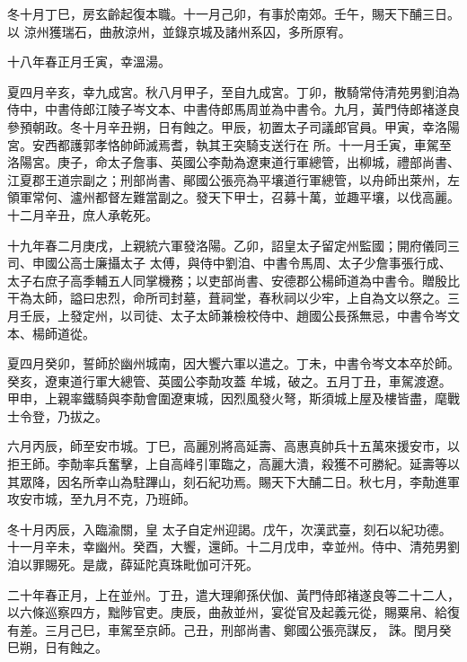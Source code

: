 \begin{pinyinscope}
 冬十月丁巳，房玄齡起復本職。十一月己卯，有事於南郊。壬午，賜天下酺三日。以
 涼州獲瑞石，曲赦涼州，並錄京城及諸州系囚，多所原宥。



 十八年春正月壬寅，幸溫湯。



 夏四月辛亥，幸九成宮。秋八月甲子，至自九成宮。丁卯，散騎常侍清苑男劉洎為侍中，中書侍郎江陵子岑文本、中書侍郎馬周並為中書令。九月，黃門侍郎褚遂良參預朝政。冬十月辛丑朔，日有蝕之。甲辰，初置太子司議郎官員。甲寅，幸洛陽宮。安西都護郭孝恪帥師滅焉耆，執其王突騎支送行在
 所。十一月壬寅，車駕至洛陽宮。庚子，命太子詹事、英國公李勣為遼東道行軍總管，出柳城，禮部尚書、江夏郡王道宗副之；刑部尚書、鄖國公張亮為平壤道行軍總管，以舟師出萊州，左領軍常何、瀘州都督左難當副之。發天下甲士，召募十萬，並趣平壤，以伐高麗。十二月辛丑，庶人承乾死。



 十九年春二月庚戌，上親統六軍發洛陽。乙卯，詔皇太子留定州監國；開府儀同三司、申國公高士廉攝太子
 太傅，與侍中劉洎、中書令馬周、太子少詹事張行成、太子右庶子高季輔五人同掌機務；以吏部尚書、安德郡公楊師道為中書令。贈殷比干為太師，謚曰忠烈，命所司封墓，葺祠堂，春秋祠以少牢，上自為文以祭之。三月壬辰，上發定州，以司徒、太子太師兼檢校侍中、趙國公長孫無忌，中書令岑文本、楊師道從。



 夏四月癸卯，誓師於幽州城南，因大饗六軍以遣之。丁未，中書令岑文本卒於師。癸亥，遼東道行軍大總管、英國公李勣攻蓋
 牟城，破之。五月丁丑，車駕渡遼。甲申，上親率鐵騎與李勣會圍遼東城，因烈風發火弩，斯須城上屋及樓皆盡，麾戰士令登，乃拔之。



 六月丙辰，師至安市城。丁巳，高麗別將高延壽、高惠真帥兵十五萬來援安市，以拒王師。李勣率兵奮擊，上自高峰引軍臨之，高麗大潰，殺獲不可勝紀。延壽等以其眾降，因名所幸山為駐蹕山，刻石紀功焉。賜天下大酺二日。秋七月，李勣進軍攻安市城，至九月不克，乃班師。



 冬十月丙辰，入臨渝關，皇
 太子自定州迎謁。戊午，次漢武臺，刻石以紀功德。十一月辛未，幸幽州。癸酉，大饗，還師。十二月戊申，幸並州。侍中、清苑男劉洎以罪賜死。是歲，薛延陀真珠毗伽可汗死。



 二十年春正月，上在並州。丁丑，遣大理卿孫伏伽、黃門侍郎褚遂良等二十二人，以六條巡察四方，黜陟官吏。庚辰，曲赦並州，宴從官及起義元從，賜粟帛、給復有差。三月己巳，車駕至京師。己丑，刑部尚書、鄭國公張亮謀反，
 誅。閏月癸巳朔，日有蝕之。




\end{pinyinscope}
